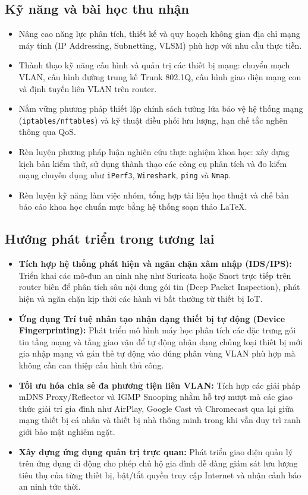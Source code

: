 \vspace{5mm}
\subsection*{Kỹ năng và bài học thu nhận}
\begin{itemize}
    \item Nâng cao năng lực phân tích, thiết kế và quy hoạch không gian địa chỉ mạng máy tính (IP Addressing, Subnetting, VLSM) phù hợp với nhu cầu thực tiễn.
    \item Thành thạo kỹ năng cấu hình và quản trị các thiết bị mạng: chuyển mạch VLAN, cấu hình đường trung kế Trunk 802.1Q, cấu hình giao diện mạng con và định tuyến liên VLAN trên router.
    \item Nắm vững phương pháp thiết lập chính sách tường lửa bảo vệ hệ thống mạng (\texttt{iptables/nftables}) và kỹ thuật điều phối lưu lượng, hạn chế tắc nghẽn thông qua QoS.
    \item Rèn luyện phương pháp luận nghiên cứu thực nghiệm khoa học: xây dựng kịch bản kiểm thử, sử dụng thành thạo các công cụ phân tích và đo kiểm mạng chuyên dụng như \texttt{iPerf3}, \texttt{Wireshark}, \texttt{ping} và \texttt{Nmap}.
    \item Rèn luyện kỹ năng làm việc nhóm, tổng hợp tài liệu học thuật và chế bản báo cáo khoa học chuẩn mực bằng hệ thống soạn thảo \LaTeX.
\end{itemize}

\vspace{5mm}
\subsection*{Hướng phát triển trong tương lai}
\begin{itemize}
    \item \textbf{Tích hợp hệ thống phát hiện và ngăn chặn xâm nhập (IDS/IPS):} Triển khai các mô-đun an ninh nhẹ như Suricata hoặc Snort trực tiếp trên router biên để phân tích sâu nội dung gói tin (Deep Packet Inspection), phát hiện và ngăn chặn kịp thời các hành vi bất thường từ thiết bị IoT.
    \item \textbf{Ứng dụng Trí tuệ nhân tạo nhận dạng thiết bị tự động (Device Fingerprinting):} Phát triển mô hình máy học phân tích các đặc trưng gói tin tầng mạng và tầng giao vận để tự động nhận dạng chủng loại thiết bị mới gia nhập mạng và gán thẻ tự động vào đúng phân vùng VLAN phù hợp mà không cần can thiệp cấu hình thủ công.
    \item \textbf{Tối ưu hóa chia sẻ đa phương tiện liên VLAN:} Tích hợp các giải pháp mDNS Proxy/Reflector và IGMP Snooping nhằm hỗ trợ mượt mà các giao thức giải trí gia đình như AirPlay, Google Cast và Chromecast qua lại giữa mạng thiết bị cá nhân và thiết bị nhà thông minh trong khi vẫn duy trì ranh giới bảo mật nghiêm ngặt.
    \item \textbf{Xây dựng ứng dụng quản trị trực quan:} Phát triển giao diện quản lý trên ứng dụng di động cho phép chủ hộ gia đình dễ dàng giám sát lưu lượng tiêu thụ của từng thiết bị, bật/tắt quyền truy cập Internet và nhận cảnh báo an ninh tức thời.
\end{itemize}
